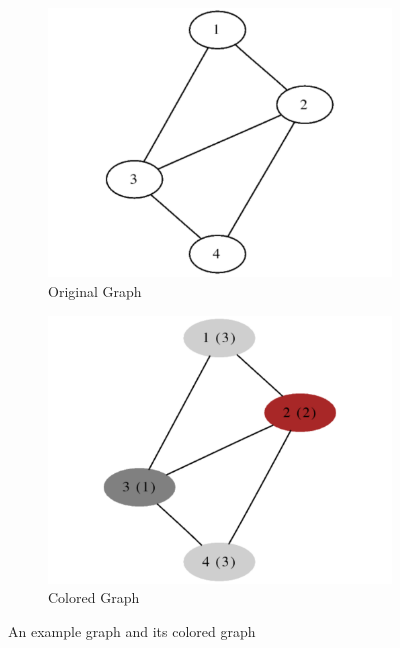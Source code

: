 \documentclass[11pt,letterpaper,oneside]{article}
\begin{document}
\begin{figure}
  \centering
  \begin{subfigure}[b]{0.35\textwidth}
    \centering
    \includegraphics[width=\textwidth]{gc1}
    \caption{Original Graph}
    \label{fig:orig}
  \end{subfigure}%
  \begin{subfigure}[b]{0.35\textwidth}
    \centering
    \includegraphics[width=\textwidth]{gc2}
    \caption{Colored Graph}
    \label{fig:colored}
  \end{subfigure}
  \caption{An example graph and its colored graph}\label{fig:example}
\end{figure}
\end{document}
